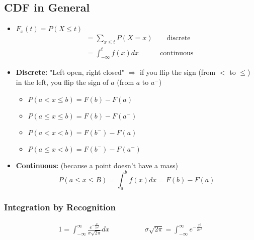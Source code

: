 \subsection*{CDF in General}
\begin{itemize}
	\item $F_x(t) = P(X \leq t)$
	\begin{align*}
		& = \sum\limits_{x \leq t} P(X = x) \quad \quad \text{discrete}\\
		& = \int_{-\infty}^{t} f(x) dx \quad \quad \quad \text{continuous}
	\end{align*}
	\item \textbf{Discrete: } "Left open, right closed" $\Rightarrow$ if you flip the sign (from $<$ to $\leq$) in the left, you flip the sign of $a$ (from $a$ to $a^-$)
	\begin{itemize}[label={--}]
		\item $P(a < x \leq b) = F(b) - F(a)$
		\item $P(a \leq x \leq b) = F(b) - F(a^-)$
		\item $P(a < x < b) = F(b^-) - F(a)$
		\item $P(a \leq x < b) = F(b^-) - F(a^-)$
	\end{itemize}
	\item \textbf{Continuous: } (because a point doesn't have a mass)
	\begin{equation*}
		P(a \leq x \leq B) = \int_a^b f(x) dx = F(b) - F(a)
	\end{equation*}
\end{itemize}
\subsubsection*{Integration by Recognition}
\begin{gather*}
	1 = \int_{-\infty}^{\infty} \frac{e^{-\frac{x^2}{2\sigma^2}}}{\sigma \sqrt{2\pi}} dx \hspace{5em} \sigma \sqrt{2\pi} = \int_{-\infty}^{\infty} e^{-\frac{x^2}{2\sigma^2}} \tag{normal dist.}
\end{gather*}
